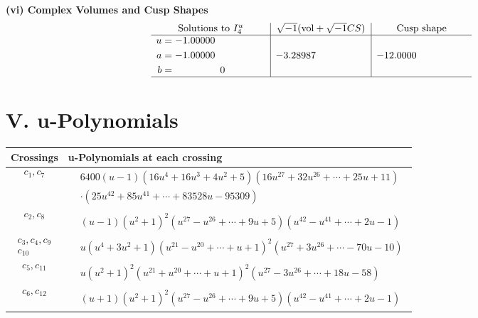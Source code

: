 \documentclass[1p]{elsarticle_modified}
\theoremstyle{definition}
\newcommand{\I}{\sqrt{-1}}
\begin{document}
\newpage\flushleft \textbf{(vi) Complex Volumes and Cusp Shapes}
$$\begin{array}{c|c|c}  
\text{Solutions to }I^u_{4}& \I (\text{vol} + \sqrt{-1}CS) & \text{Cusp shape}\\
 \hline 
\begin{aligned}
u &= -1.00000\phantom{ +0.000000I} \\
a &= -1.00000\phantom{ +0.000000I} \\
b &= \phantom{-0.000000 } 0\end{aligned}
 & -3.28987\phantom{ +0.000000I} & -12.0000\phantom{ +0.000000I}\\
 \hline 
 \end{array}$$\newpage
\newpage\renewcommand{\arraystretch}{1}
\centering \section*{ V. u-Polynomials}
\begin{tabular}{m{50pt}|m{274pt}}
Crossings & \hspace{64pt}u-Polynomials at each crossing \\
\hline $$\begin{aligned}c_{1},c_{7}\end{aligned}$$&$\begin{aligned}
&6400(u-1)(16 u^{4}+16 u^{3}+4 u^{2}+5)(16 u^{27}+32 u^{26}+\cdots+25 u+11)\\
&\cdot(25 u^{42}+85 u^{41}+\cdots+83528 u-95309)
\end{aligned}$\\
\hline $$\begin{aligned}c_{2},c_{8}\end{aligned}$$&$\begin{aligned}
&(u-1)(u^2+1)^2(u^{27}- u^{26}+\cdots+9 u+5)(u^{42}- u^{41}+\cdots+2 u-1)
\end{aligned}$\\
\hline $$\begin{aligned}c_{3},c_{4},c_{9}\\c_{10}\end{aligned}$$&$\begin{aligned}
&u(u^4+3 u^2+1)(u^{21}- u^{20}+\cdots+u+1)^{2}(u^{27}+3 u^{26}+\cdots-70 u-10)
\end{aligned}$\\
\hline $$\begin{aligned}c_{5},c_{11}\end{aligned}$$&$\begin{aligned}
&u(u^2+1)^2(u^{21}+u^{20}+\cdots+u+1)^{2}(u^{27}-3 u^{26}+\cdots+18 u-58)
\end{aligned}$\\
\hline $$\begin{aligned}c_{6},c_{12}\end{aligned}$$&$\begin{aligned}
&(u+1)(u^2+1)^2(u^{27}- u^{26}+\cdots+9 u+5)(u^{42}- u^{41}+\cdots+2 u-1)
\end{aligned}$\\
\hline
\end{tabular}\newpage\renewcommand{\arraystretch}{1}
\end{document}
